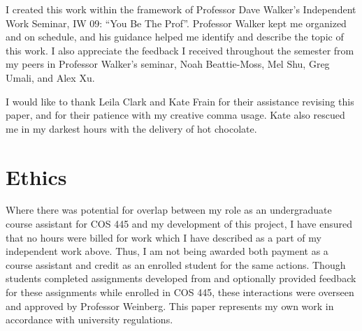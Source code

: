 \documentclass[pageno]{jpaper}
\begin{document}
I created this work within the framework of Professor Dave Walker's Independent Work Seminar, IW 09: ``You Be The Prof''.
Professor Walker kept me organized and on schedule, and his guidance helped me identify and describe the topic of this work.
I also appreciate the feedback I received throughout the semester from my peers in Professor Walker's seminar, Noah Beattie-Moss, Mel Shu, Greg Umali, and Alex Xu.

I would like to thank Leila Clark and Kate Frain for their assistance revising this paper, and for their patience with my creative comma usage.
Kate also rescued me in my darkest hours with the delivery of hot chocolate.

\section*{Ethics}
Where there was potential for overlap between my role as an undergraduate course assistant for COS 445 and my development of this project, I have ensured that no hours were billed for work which I have described as a part of my independent work above.
Thus, I am not being awarded both payment as a course assistant and credit as an enrolled student for the same actions.
Though students completed assignments developed from and optionally provided feedback for these assignments while enrolled in COS 445, these interactions were overseen and approved by Professor Weinberg.
This paper represents my own work in accordance with university regulations.
\end{document}

